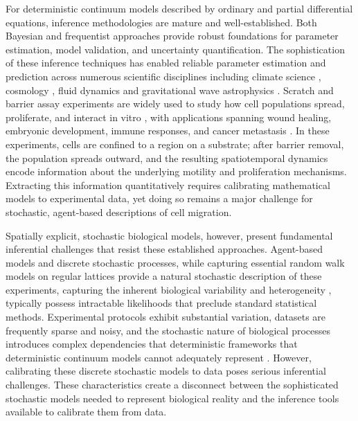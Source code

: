 \documentclass{article}
\providecommand{\DIFaddtex}[1]{{\protect\color{blue} \sf #1}} %
\providecommand{\DIFdeltex}[1]{{\protect\color{red} \scriptsize #1}} %
\providecommand{\DIFaddbegin}{} %
\providecommand{\DIFaddend}{} %
\providecommand{\DIFdelbegin}{} %
\providecommand{\DIFdelend}{} %
\providecommand{\DIFadd}[1]{\texorpdfstring{\DIFaddtex{#1}}{#1}} %
\providecommand{\DIFdel}[1]{\texorpdfstring{\DIFdeltex{#1}}{}} %
\newcommand{\DIFscaledelfig}{0.5}
\newlength{\DIFdelgraphicswidth} %
\newlength{\DIFdelgraphicsheight} %
\newcommand{\DIFaddincludegraphics}[2][]{{\color{blue}\fbox{\DIFOincludegraphics[#1]{#2}}}} %
\newcommand{\DIFdelincludegraphics}[2][]{%
\sbox{\DIFdelgraphicsbox}{\DIFOincludegraphics[#1]{#2}}%
\settoboxwidth{\DIFdelgraphicswidth}{\DIFdelgraphicsbox} %
\settoboxtotalheight{\DIFdelgraphicsheight}{\DIFdelgraphicsbox} %
\scalebox{\DIFscaledelfig}{%
\parbox[b]{\DIFdelgraphicswidth}{\usebox{\DIFdelgraphicsbox}\\[-\baselineskip] \rule{\DIFdelgraphicswidth}{0em}}\llap{\resizebox{\DIFdelgraphicswidth}{\DIFdelgraphicsheight}{%
\setlength{\unitlength}{\DIFdelgraphicswidth}%
\begin{picture}(1,1)%
\thicklines\linethickness{2pt} %
{\color[rgb]{1,0,0}\put(0,0){\framebox(1,1){}}}%
{\color[rgb]{1,0,0}\put(0,0){\line( 1,1){1}}}%
{\color[rgb]{1,0,0}\put(0,1){\line(1,-1){1}}}%
\end{picture}%
}\hspace*{3pt}}} %
} %
\DeclareRobustCommand{\DIFaddbegin}{\DIFOaddbegin \let\includegraphics\DIFaddincludegraphics} %
\DeclareRobustCommand{\DIFaddend}{\DIFOaddend \let\includegraphics\DIFOincludegraphics} %
\DeclareRobustCommand{\DIFdelbegin}{\DIFOdelbegin \let\includegraphics\DIFdelincludegraphics} %
\DeclareRobustCommand{\DIFdelend}{\DIFOaddend \let\includegraphics\DIFOincludegraphics} %
\begin{document}
\DIFdelbegin \DIFdel{For deterministic continuum models described by ordinary and partial differential equations, inference methodologies are mature and well-established. Both Bayesian \citep{Bernardo1994,Gelman1995} and frequentist \citep{Cox1974,Casella1990} approaches provide robust foundations for parameter estimation, model validation, and uncertainty quantification. The sophistication of these inference techniques has enabled reliable parameter estimation and prediction across numerous scientific disciplines including climate science \citep{Vrugt2014}, cosmology \citep{Planck2018Params}, fluid dynamics \citep{Cheung2011} and gravitational wave astrophysics \citep{Veitch2015}. }\DIFdelend \DIFaddbegin \DIFadd{Scratch and barrier assay experiments are widely used to study how cell populations spread, proliferate, and interact in vitro \citep{Jin2016ScratchRepro,Johnston2014LeadingEdgeInfo,Simpson2013CircularBarrier}, with applications spanning wound healing, embryonic development, immune responses, and cancer metastasis \citep{Friedl2009,Rorth2009}. In these experiments, cells are confined to a region on a substrate; after barrier removal, the population spreads outward, and the resulting spatiotemporal dynamics encode information about the underlying motility and proliferation mechanisms. Extracting this information quantitatively requires calibrating mathematical models to experimental data, yet doing so remains a major challenge for stochastic, agent-based descriptions of cell migration.
}\DIFaddend 

\DIFdelbegin \DIFdel{Spatially explicit, stochastic biological models, however, present fundamental inferential challenges that resist these established approaches.
}\DIFdelend Agent-based \DIFdelbegin \DIFdel{models and discrete stochastic processes, while capturing essential }\DIFdelend \DIFaddbegin \DIFadd{random walk models on regular lattices provide a natural stochastic description of these experiments, capturing the inherent }\DIFaddend biological variability and heterogeneity \DIFdelbegin \DIFdel{, typically possess intractable likelihoods that preclude standard statistical methods. Experimental protocols exhibit substantial variation, datasets are frequently sparse and noisy, and the stochastic nature of biological processes introduces complex dependencies that deterministic frameworks }\DIFdelend \DIFaddbegin \DIFadd{that deterministic continuum models }\DIFaddend cannot adequately represent \DIFaddbegin \DIFadd{\citep{Codling2008,Simpson2025.05.25.656057,Plank2025}. However, calibrating these discrete stochastic models to data poses serious inferential challenges}\DIFaddend . \DIFdelbegin \DIFdel{These characteristics create a disconnect between the sophisticated stochastic models needed to represent biological reality and the inference tools available to calibrate them from data.
}%
\end{document}
